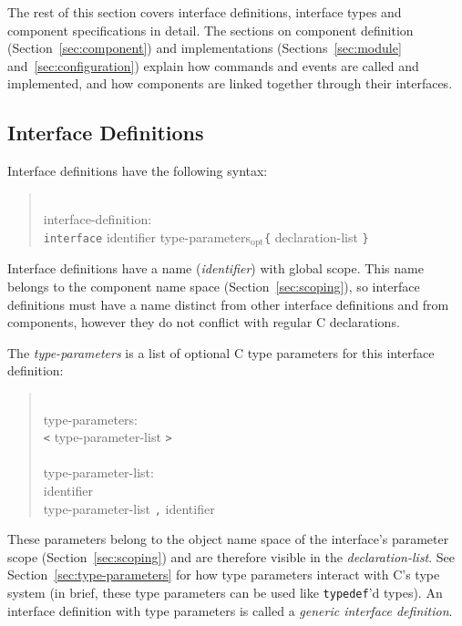\documentclass[11pt,letterpaper]{article}
\newcommand{\kw}[1]{{\tt #1}}
\newcommand{\opt}{$_{\mbox{opt}}$\xspace}
\newcommand{\grammarshift}{\vspace*{-.7cm}}
\newcommand{\grammarindent}{\hspace*{2cm}\= \\ \kill}
\begin{document}
The rest of this section covers interface definitions, interface types and
component specifications in detail. The sections on component definition
(Section~\ref{sec:component}) and implementations
(Sections~\ref{sec:module} and~\ref{sec:configuration}) explain how
commands and events are called and implemented, and how components are
linked together through their interfaces.

\subsection{Interface Definitions}

Interface definitions have the following syntax:
\begin{quote} \grammarshift
\em \begin{tabbing}
\grammarindent
interface-definition:\\
\>	\kw{interface} identifier type-parameters\opt\kw{\{} declaration-list \kw{\}}
\end{tabbing}
\end{quote}
Interface definitions have a name (\emph{identifier}) with global
scope. This name belongs to the component name space
(Section~\ref{sec:scoping}), so interface definitions must have a name
distinct from other interface definitions and from components, however they
do not conflict with regular C declarations.

The \emph{type-parameters} is a list of optional C type parameters
for this interface definition:
\begin{quote} \grammarshift
\em \begin{tabbing}
\grammarindent
type-parameters:\\
\>	\kw{<} type-parameter-list \kw{>}\\
\\
type-parameter-list:\\
\>	identifier\\
\>	type-parameter-list \kw{,} identifier
\end{tabbing}
\end{quote}
These parameters belong to the object name space of the interface's
parameter scope (Section~\ref{sec:scoping}) and are therefore visible in
the \emph{declaration-list}. See Section~\ref{sec:type-parameters} for how
type parameters interact with C's type system (in brief, these type
parameters can be used like \kw{typedef}'d types). An interface definition
with type parameters is called a \emph{generic interface definition}.
\end{document}
